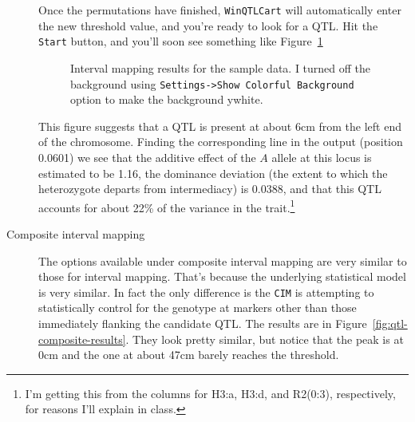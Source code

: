 \documentclass[12pt]{article}
\begin{document}
\begin{description}
  Once the permutations have finished, {\tt WinQTLCart} will
  automatically enter the new threshold value, and you're ready to
  look for a QTL. Hit the {\tt Start} button, and you'll soon see
  something like Figure~\ref{fig:qtl-interval-results}

\begin{figure}
\begin{center}
\end{center}
\caption{Interval mapping results for the sample data. I turned off
    the background using {\tt Settings->Show Colorful Background}
    option to make the background ywhite.}\label{fig:qtl-interval-results}
\end{figure}

This figure suggests that a QTL is present at about 6cm from the
left end of the chromosome. Finding the corresponding line in the
output (position 0.0601) we see that the additive effect of the $A$
allele at this locus is estimated to be 1.16, the dominance
deviation (the extent to which the heterozygote departs from
intermediacy) is 0.0388, and that this QTL accounts for about 22\% of
the variance in the trait.\footnote{I'm getting this from the columns
  for H3:a, H3:d, and R2(0:3), respectively, for reasons I'll explain
  in class.}

\item[Composite interval mapping] The options available under
  composite interval mapping are very similar to those for interval
  mapping. That's because the underlying statistical model is very
  similar. In fact the only difference is the {\tt CIM} is attempting
  to statistically control for the genotype at markers other than
  those immediately flanking the candidate QTL. The results are in
  Figure~\ref{fig:qtl-composite-results}. They look pretty similar,
  but notice that the peak is at 0cm and the one at about 47cm barely
  reaches the threshold.


\end{description}
\end{document}
